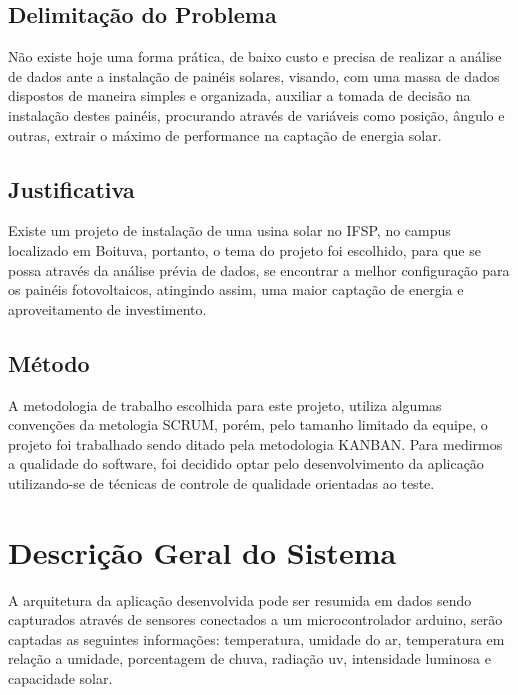 \section{Delimitação do Problema}

Não existe hoje uma forma prática, de baixo custo e precisa de realizar a análise de dados ante a instalação de painéis solares, visando, com uma massa de dados dispostos de maneira simples e organizada, auxiliar a tomada de decisão na instalação destes painéis, procurando através de variáveis como posição, ângulo e outras, extrair o máximo de performance na captação de energia solar.

\section{Justificativa}

Existe um projeto de instalação de uma usina solar no IFSP, no campus localizado em Boituva, portanto, o tema do projeto foi escolhido, para que se possa através da análise prévia de dados, se encontrar a melhor configuração para os painéis fotovoltaicos, atingindo assim, uma maior captação de energia e aproveitamento de investimento.

\section{Método}

A metodologia de trabalho escolhida para este projeto, utiliza algumas convenções da metologia SCRUM, porém, pelo tamanho limitado da equipe, o projeto foi trabalhado sendo ditado pela metodologia KANBAN.
Para medirmos a qualidade do software, foi decidido optar pelo desenvolvimento da aplicação utilizando-se de técnicas de controle de qualidade orientadas ao teste.

\chapter{Descrição Geral do Sistema}

A arquitetura da aplicação desenvolvida pode ser resumida em dados sendo capturados através de sensores conectados a um microcontrolador arduino, serão captadas as seguintes informações: temperatura, umidade do ar, temperatura em relação a umidade, porcentagem de chuva, radiação uv, intensidade luminosa e capacidade solar.

